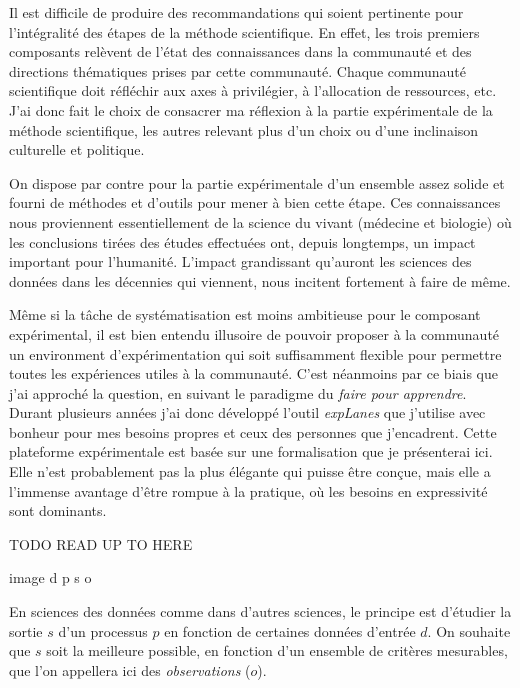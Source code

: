 Il est difficile de produire des recommandations qui soient pertinente pour l'intégralité des étapes de la méthode scientifique. En effet, les trois premiers composants relèvent de l'état des connaissances dans la communauté et des \og directions \fg thématiques prises par cette communauté. Chaque communauté scientifique doit réfléchir aux axes à privilégier, à l'allocation de ressources, etc. J'ai donc fait le choix de consacrer ma réflexion à la partie expérimentale de la méthode scientifique, les autres relevant plus d'un choix ou d'une inclinaison culturelle et politique.

On dispose par contre pour la partie expérimentale d'un ensemble assez solide et fourni de méthodes et d'outils pour mener à bien cette étape. Ces connaissances nous proviennent essentiellement de la science du vivant (médecine et biologie) où les conclusions tirées des études effectuées ont, depuis longtemps, un impact important pour l'humanité. L'impact grandissant qu'auront les sciences des données dans les décennies qui viennent, nous incitent fortement à faire de même.

Même si la tâche de systématisation est moins ambitieuse pour le composant expérimental, il est bien entendu illusoire de pouvoir proposer à la communauté un environment d'expérimentation qui soit suffisamment flexible pour permettre toutes les expériences utiles à la communauté. C'est néanmoins par ce biais que j'ai approché la question, en suivant le paradigme du \textsl{faire pour apprendre}. Durant plusieurs années j'ai donc développé l'outil \textsl{expLanes}\cite{explanes} que j'utilise avec bonheur pour mes besoins propres et ceux des personnes que j'encadrent. Cette plateforme expérimentale est basée sur une formalisation que je présenterai ici. Elle n'est probablement pas la plus élégante qui puisse être conçue, mais elle a l'immense avantage d'être rompue à la pratique, où les besoins en expressivité sont dominants.

TODO READ UP TO HERE

image d p s
        o

En sciences des données comme dans d'autres sciences, le principe est d'étudier la sortie $s$ d'un processus $p$ en fonction de certaines données d'entrée $d$. On souhaite que $s$ soit la meilleure possible, en fonction d'un ensemble de critères mesurables, que l'on appellera ici des \textsl{observations} ($o$).

